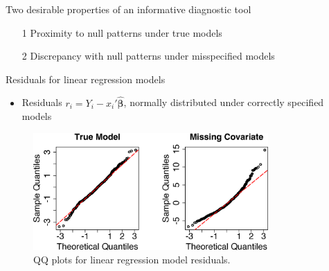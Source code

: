 \documentclass[
  ignorenonframetext,
]{beamer}
\begin{document}
\begin{frame}{Two desirable properties of an informative diagnostic
tool}
\protect\hypertarget{two-desirable-properties-of-an-informative-diagnostic-tool}{}
\begin{itemize}
        \vspace{0.1in}
        \item[1] Proximity to null patterns under true models
        \vspace{0.2in}
        \item[2] Discrepancy with null patterns under misspecified models
\end{itemize}
\end{frame}

\begin{frame}{Residuals for linear regression models}
\protect\hypertarget{residuals-for-linear-regression-models}{}
\begin{itemize}
    \item Residuals $r_i=Y_i-x_i'\hat{\bm\beta}$, normally distributed under correctly specified models
\end{itemize}

\begin{figure}[h]
    \centering
    \includegraphics[width=0.8\textwidth]{figures/lmexam}
    \caption{QQ plots for linear regression model residuals.}
\end{figure}
\end{frame}
\end{document}
